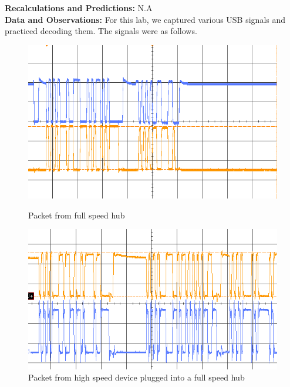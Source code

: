 \documentclass{article}
\newcommand{\sect}[1]{\noindent\textbf{#1}}
\begin{document}
\sect{Recalculations and Predictions:} N.A\\

\sect{Data and Observations:} For this lab, we captured various USB signals and practiced decoding them. The signals were as follows.


\begin{figure}[H]
	\centering
	\begin{minipage}[t]{.5\textwidth}
		\centering
		\includegraphics[width=.94\linewidth]{1}
		\caption{Packet from full speed hub}
	\end{minipage}%
	\begin{minipage}[t]{.5\textwidth}
		\centering
		\includegraphics[width=.94\linewidth]{2}
		\caption{Packet from high speed device plugged into a full speed hub}
	\end{minipage}
\end{figure}
\end{document}
